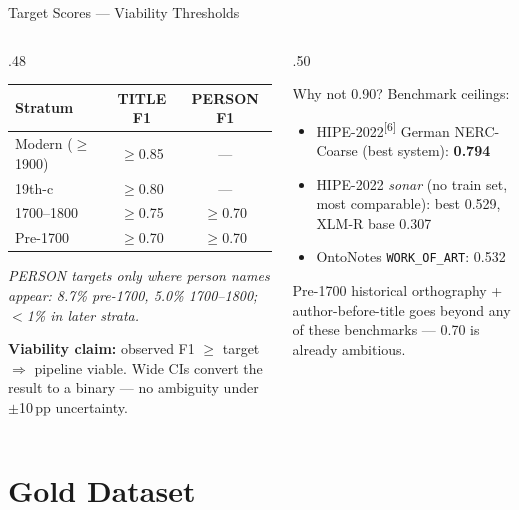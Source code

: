 \documentclass[xcolor,aspectratio=169,compress]{beamer}
\begin{document}
\begin{frame}{Target Scores --- Viability Thresholds}
  \small
  \begin{columns}
    \begin{column}{.48\textwidth}
      \begin{center}
      \begin{tabular}{lcc}
        \toprule
        Stratum & TITLE F1 & PERSON F1 \\
        \midrule
        Modern ($\geq$1900) & $\geq$0.85 & --- \\
        19th-c              & $\geq$0.80 & --- \\
        1700--1800          & $\geq$0.75 & $\geq$0.70 \\
        Pre-1700            & $\geq$0.70 & $\geq$0.70 \\
        \bottomrule
      \end{tabular}
      \end{center}
      \smallskip
      \textit{PERSON targets only where person names appear:
        8.7\% pre-1700, 5.0\% 1700--1800; $<$1\% in later strata.}
      \smallskip

      \textbf{Viability claim:} observed F1 $\geq$ target $\Rightarrow$ pipeline viable.
      Wide CIs convert the result to a binary --- no ambiguity under $\pm$10\,pp uncertainty.
    \end{column}
    \begin{column}{.50\textwidth}
      \begin{block}{Why not 0.90? Benchmark ceilings:}
        \begin{itemize}\setlength{\itemsep}{2pt}
          \item HIPE-2022\textsuperscript{[6]} German NERC-Coarse (best system): \textbf{0.794}
          \item HIPE-2022 \textit{sonar} (no train set, most comparable):
                best 0.529, XLM-R base 0.307
          \item OntoNotes \texttt{WORK\_OF\_ART}: 0.532
        \end{itemize}
        Pre-1700 historical orthography + author-before-title goes
        beyond any of these benchmarks --- 0.70 is already ambitious.
      \end{block}
    \end{column}
  \end{columns}
\end{frame}

\section{Gold Dataset}
\end{document}
